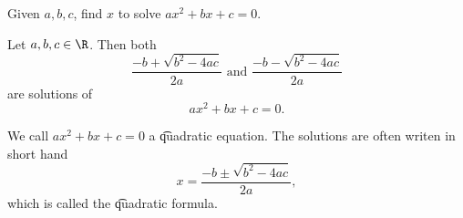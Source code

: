 
Given $a, b, c$, find $x$ to solve $ax^2 + bx + c = 0$.

\begin{proposition}
Let $a, b, c \in \R$. Then both
  \[
\frac{-b + \sqrt{b^2 - 4ac}}{2a} \text{ and } \frac{-b - \sqrt{b^2 - 4ac}}{2a}
  \]
are solutions of
  \[
ax^2 + bx + c = 0.
  \]
\end{proposition}
We call $ax^2 + bx + c = 0$ a \t{quadratic equation}.
The solutions are often writen in short hand
  \[
x = \frac{-b \pm \sqrt{b^2 - 4ac}}{2a},
  \]
which is called the \t{quadratic formula}.

\blankpage
